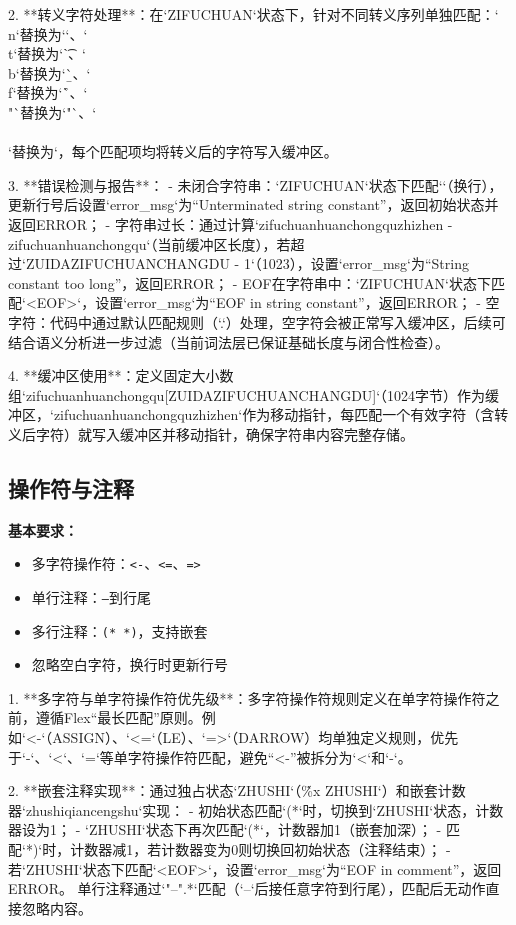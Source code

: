\documentclass[twocolumn]{article}
\begin{document}
2. **转义字符处理**：在`ZIFUCHUAN`状态下，针对不同转义序列单独匹配：`\\n`替换为`\n`、`\\t`替换为`\t`、`\\b`替换为`\b`、`\\f`替换为`\f`、`\\"`替换为`"`、`\\\\`替换为`\`，每个匹配项均将转义后的字符写入缓冲区。

3. **错误检测与报告**：
   - 未闭合字符串：`ZIFUCHUAN`状态下匹配`\n`（换行），更新行号后设置`error_msg`为“Unterminated string constant”，返回初始状态并返回ERROR；
   - 字符串过长：通过计算`zifuchuanhuanchongquzhizhen - zifuchuanhuanchongqu`（当前缓冲区长度），若超过`ZUIDAZIFUCHUANCHANGDU - 1`（1023），设置`error_msg`为“String constant too long”，返回ERROR；
   - EOF在字符串中：`ZIFUCHUAN`状态下匹配`<EOF>`，设置`error_msg`为“EOF in string constant”，返回ERROR；
   - 空字符：代码中通过默认匹配规则（`.`）处理，空字符会被正常写入缓冲区，后续可结合语义分析进一步过滤（当前词法层已保证基础长度与闭合性检查）。

4. **缓冲区使用**：定义固定大小数组`zifuchuanhuanchongqu[ZUIDAZIFUCHUANCHANGDU]`（1024字节）作为缓冲区，`zifuchuanhuanchongquzhizhen`作为移动指针，每匹配一个有效字符（含转义后字符）就写入缓冲区并移动指针，确保字符串内容完整存储。

\subsection{操作符与注释}

\textbf{基本要求：}
\begin{itemize}
    \item 多字符操作符：\texttt{<-}、\texttt{<=}、\texttt{=>}
    \item 单行注释：\texttt{--}到行尾
    \item 多行注释：\texttt{(* *)}，支持嵌套
    \item 忽略空白字符，换行时更新行号
\end{itemize}

1. **多字符与单字符操作符优先级**：多字符操作符规则定义在单字符操作符之前，遵循Flex“最长匹配”原则。例如`<-`（ASSIGN）、`<=`（LE）、`=>`（DARROW）均单独定义规则，优先于`-`、`<`、`=`等单字符操作符匹配，避免“<-”被拆分为`<`和`-`。

2. **嵌套注释实现**：通过独占状态`ZHUSHI`（\`\%x ZHUSHI`）和嵌套计数器`zhushiqiancengshu`实现：
   - 初始状态匹配`(*`时，切换到`ZHUSHI`状态，计数器设为1；
   - `ZHUSHI`状态下再次匹配`(*`，计数器加1（嵌套加深）；
   - 匹配`*)`时，计数器减1，若计数器变为0则切换回初始状态（注释结束）；
   - 若`ZHUSHI`状态下匹配`<EOF>`，设置`error_msg`为“EOF in comment”，返回ERROR。
   单行注释通过`"--".*`匹配（`--`后接任意字符到行尾），匹配后无动作直接忽略内容。
\end{document}
